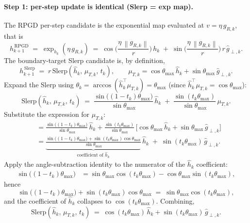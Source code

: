 \documentclass[11pt]{article}
\newcommand{\hh}{\hat h}
\newcommand{\thmax}{\theta_{\max}}
\newcommand{\norm}[1]{\left\lVert#1\right\rVert}
\begin{document}
\paragraph{Step 1: per-step update is identical (Slerp = exp map).} The RPGD per-step candidate is the exponential map evaluated at $v = \eta\,g_{R,k}$, that is
\begin{equation}
h_{k+1}^{\,\text{RPGD}} \;=\; \exp_{h_k}(\eta\,g_{R,k}) \;=\; \cos\!\Big(\frac{\eta\,\norm{g_{R,k}}}{r}\Big)\,h_k \;+\; \sin\!\Big(\frac{\eta\,\norm{g_{R,k}}}{r}\Big)\,r\,\hat g_{\perp,k}.
\label{eq:rpgd-step}
\end{equation}
The boundary-target Slerp candidate is, by definition,
\begin{equation*}
h_{k+1}^{\,\text{Slerp}} \;=\; r\,\mathrm{Slerp}(\hh_k,\, \mu_{T,k},\, t_k), \qquad \mu_{T,k} = \cos\thmax\,\hh_k + \sin\thmax\,\hat g_{\perp,k}.
\end{equation*}
Expand the Slerp using $\theta_k = \arccos(\hh_k^\top \mu_{T,k}) = \thmax$ (since $\hh_k^\top \mu_{T,k} = \cos\thmax$):
\begin{equation*}
\mathrm{Slerp}(\hh_k,\, \mu_{T,k},\, t_k) \;=\; \frac{\sin\!\big((1-t_k)\thmax\big)}{\sin\thmax}\,\hh_k \;+\; \frac{\sin(t_k\thmax)}{\sin\thmax}\,\mu_{T,k}.
\end{equation*}
Substitute the expression for $\mu_{T,k}$:
\begin{align*}
&= \frac{\sin\!\big((1-t_k)\thmax\big)}{\sin\thmax}\,\hh_k + \frac{\sin(t_k\thmax)}{\sin\thmax}\,\big[\cos\thmax\,\hh_k + \sin\thmax\,\hat g_{\perp,k}\big]\\
&= \underbrace{\frac{\sin\!\big((1-t_k)\thmax\big) + \sin(t_k\thmax)\cos\thmax}{\sin\thmax}}_{\text{coefficient of }\hh_k}\,\hh_k \;+\; \sin(t_k\thmax)\,\hat g_{\perp,k}.
\end{align*}
Apply the angle-subtraction identity to the numerator of the $\hh_k$ coefficient:
\begin{align*}
\sin\!\big((1-t_k)\thmax\big) &= \sin\thmax\cos(t_k\thmax) - \cos\thmax\sin(t_k\thmax),
\end{align*}
hence
\begin{equation*}
\sin\!\big((1-t_k)\thmax\big) + \sin(t_k\thmax)\cos\thmax \;=\; \sin\thmax\cos(t_k\thmax),
\end{equation*}
and the coefficient of $\hh_k$ collapses to $\cos(t_k\thmax)$. Combining,
\begin{equation*}
\mathrm{Slerp}(\hh_k,\, \mu_{T,k},\, t_k) \;=\; \cos(t_k\thmax)\,\hh_k + \sin(t_k\thmax)\,\hat g_{\perp,k}.
\end{equation*}
\end{document}
